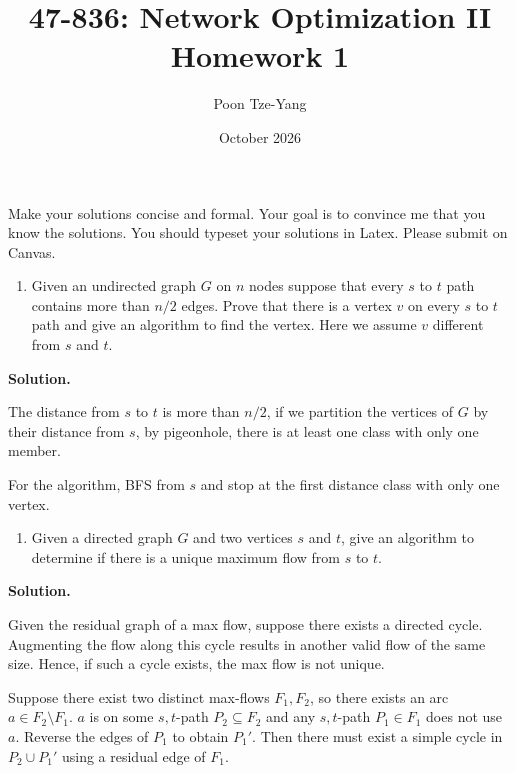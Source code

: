 \documentclass[11pt,letterpaper]{article}
\title{47-836: Network Optimization II \\ Homework 1}
\author{Poon Tze-Yang}
\date{October 2026}
\theoremstyle{definition}
\newcommand{\solution}{\medskip\noindent\textbf{Solution.}\par\medskip}
\begin{document}
\maketitle

Make your solutions concise and formal. Your goal is to convince me that you know the solutions. You should typeset your solutions in Latex. Please submit on Canvas.

\begin{enumerate}[series=q]
\item Given an undirected graph $G$ on $n$ nodes suppose that every $s$ to $t$ path contains more than $n/2$ edges. Prove that there is a vertex $v$ on every $s$ to $t$ path and give an algorithm to find the vertex. Here we assume $v$ different from $s$ and $t$.
\end{enumerate}

\solution


The distance from $s$ to $t$ is more than $n/2$, if we partition the vertices of $G$ by their distance from $s$, by pigeonhole, there is at least one class with only one member.

For the algorithm, BFS from $s$ and stop at the first distance class with only one vertex.

\begin{enumerate}[resume=q]
\item Given a directed graph $G$ and two vertices $s$ and $t$, give an algorithm to determine if there is a unique maximum flow from $s$ to $t$.
\end{enumerate}

\solution

Given the residual graph of a max flow, suppose there exists a directed cycle.
Augmenting the flow along this cycle results in another valid flow of the same size.
Hence, if such a cycle exists, the max flow is not unique.

Suppose there exist two distinct max-flows $F_1,F_2$, so there exists an arc $a\in F_2\setminus F_1$. 
$a$ is on some $s,t$-path $P_2\subseteq F_2$ and any $s,t$-path $P_1\in F_1$ does not use $a$.
Reverse the edges of $P_1$ to obtain $P_1'$. 
Then there must exist a simple cycle in $P_2\cup P_1'$ using a residual edge of $F_1$.
\end{document}
